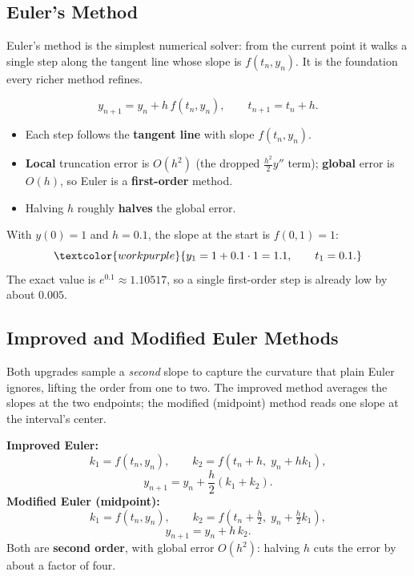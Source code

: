 \subsection{Euler's Method}

Euler's method is the simplest numerical solver: from the current point it walks
a single step along the tangent line whose slope is $f(t_n,y_n)$. It is the
foundation every richer method refines.

\begin{formulabox}
\[ y_{n+1} = y_n + h\,f(t_n,y_n), \qquad t_{n+1} = t_n + h. \]
\begin{itemize}[leftmargin=1.4em, itemsep=2pt]
    \item Each step follows the \textbf{tangent line} with slope $f(t_n,y_n)$.
    \item \textbf{Local} truncation error is $O(h^{2})$ (the dropped
          $\tfrac{h^{2}}{2}y''$ term); \textbf{global} error is $O(h)$, so Euler
          is a \textbf{first-order} method.
    \item Halving $h$ roughly \textbf{halves} the global error.
\end{itemize}
\end{formulabox}

\begin{examplebox}[Worked Example 5.1: One Euler step for $y'=y$]
With $y(0)=1$ and $h=0.1$, the slope at the start is $f(0,1)=1$:
\[ \textcolor{workpurple}{y_1 = 1 + 0.1\cdot 1 = 1.1, \qquad t_1 = 0.1.} \]
The exact value is $e^{0.1}\approx 1.10517$, so a single first-order step is
already low by about $0.005$.
\end{examplebox}

\subsection{Improved and Modified Euler Methods}

Both upgrades sample a \emph{second} slope to capture the curvature that plain
Euler ignores, lifting the order from one to two. The improved method averages
the slopes at the two endpoints; the modified (midpoint) method reads one slope
at the interval's center.

\begin{formulabox}
\textbf{Improved Euler:}
\[ k_1 = f(t_n,y_n), \qquad k_2 = f\!\left(t_n+h,\; y_n+h k_1\right), \]
\[ y_{n+1} = y_n + \frac{h}{2}\left(k_1 + k_2\right). \]
\textbf{Modified Euler (midpoint):}
\[ k_1 = f(t_n,y_n), \qquad k_2 = f\!\left(t_n+\tfrac{h}{2},\; y_n+\tfrac{h}{2}k_1\right), \]
\[ y_{n+1} = y_n + h\,k_2. \]
Both are \textbf{second order}, with global error $O(h^{2})$: halving $h$ cuts the
error by about a factor of four.
\end{formulabox}

